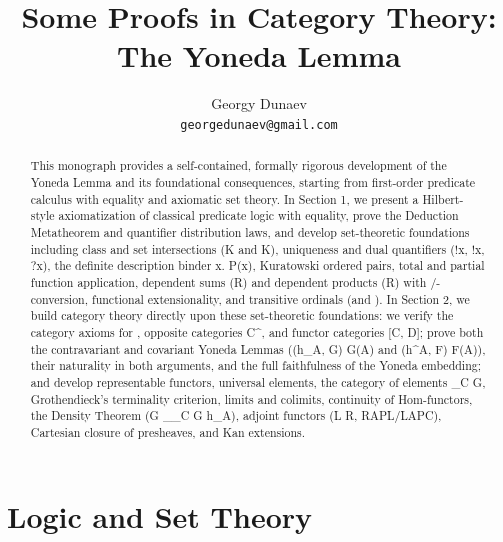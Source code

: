 \documentclass[10pt,a4paper]{article}
\title{Some Proofs in Category Theory: The Yoneda Lemma}
\author{Georgy Dunaev \\ \texttt{georgedunaev@gmail.com}}
\date{}
\begin{document}
\sloppy
\maketitle

\begin{abstract}
This monograph provides a self-contained, formally rigorous development of the Yoneda Lemma and its foundational consequences, starting from first-order predicate calculus with equality and axiomatic set theory. In Section 1, we present a Hilbert-style axiomatization of classical predicate logic with equality, prove the Deduction Metatheorem and quantifier distribution laws, and develop set-theoretic foundations including class and set intersections (\interclass K and \inter K), uniqueness and dual quantifiers (!x, \exists !x, ?x), the definite description binder \The x. P(x), Kuratowski ordered pairs, total and partial function application, dependent sums (\Sigma R) and dependent products (\Pi R) with \beta/\eta-conversion, functional extensionality, and transitive ordinals (\Tr and \TOrd). In Section 2, we build category theory directly upon these set-theoretic foundations: we verify the category axioms for \Set, opposite categories C^\op, and functor categories [C, D]; prove both the contravariant and covariant Yoneda Lemmas (\Nat(h_A, G) \cong G(A) and \Nat(h^A, F) \cong F(A)), their naturality in both arguments, and the full faithfulness of the Yoneda embedding; and develop representable functors, universal elements, the category of elements \int_C G, Grothendieck's terminality criterion, limits and colimits, continuity of Hom-functors, the Density Theorem (G \cong {}_{\int_C G} h_A), adjoint functors (L \dashv R, RAPL/LAPC), Cartesian closure of presheaves, and Kan extensions.
\end{abstract}

\tableofcontents

\section{Logic and Set Theory}
\end{document}
